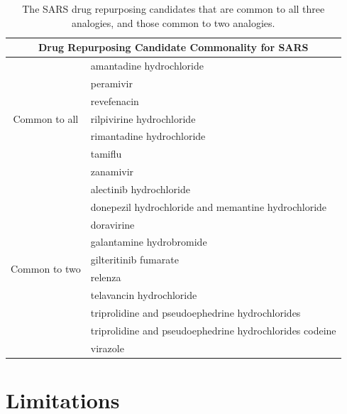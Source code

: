 \documentclass{article}
\newcommand{\lgc}[1]{\cellcolor[gray]{0.85}#1}
\begin{document}
\begin{table}[t!]
\footnotesize
\centering
\caption{The SARS drug repurposing candidates that are common to all three analogies, and those common to two analogies.}
\label{tab:drug_venn_23}
\begin{tabular}{c l}
\hline
\multicolumn{2}{c}{Drug Repurposing Candidate Commonality for SARS} \\
\hline
\multirow{7}{*}{Common to all} & \lgc{amantadine hydrochloride\cite{rejdak2020adamantanes,cimolai2020potentially}} \\ 
& peramivir \\ 
& revefenacin \\ 
& rilpivirine hydrochloride \\ 
& \lgc{rimantadine hydrochloride\cite{rejdak2020adamantanes,cimolai2020potentially}} \\ 
& tamiflu \\ 
& \lgc{zanamivir\cite{hall2020search}} \\
\hline
\multirow{10}{*}{Common to two} & alectinib hydrochloride \\ 
& \lgc{donepezil hydrochloride and memantine hydrochloride\cite{rejdak2020adamantanes,cimolai2020potentially}} \\ 
& doravirine \\ 
& galantamine hydrobromide \\ 
& gilteritinib fumarate \\ 
& \lgc{relenza\cite{hall2020search}} \\ 
& telavancin hydrochloride \\ 
& triprolidine and pseudoephedrine hydrochlorides \\ 
& triprolidine and pseudoephedrine hydrochlorides codeine \\ 
& \lgc{virazole\cite{khalili2020novel}} \\
\hline
\end{tabular}
\end{table}


\section{Limitations}
\end{document}
